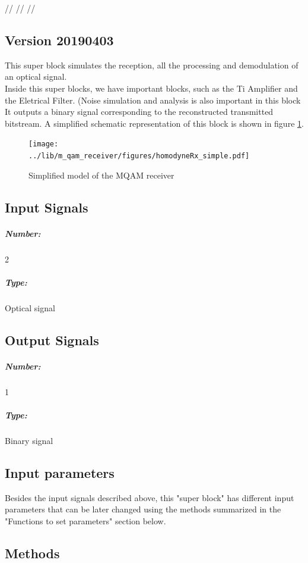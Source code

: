 //%
//%
//%

 \subsection*{\textbf{Version 20190403}}

This super block simulates the reception, all the processing and demodulation of an optical
signal.\\
Inside this super blocks, we have important blocks, such as the Ti Amplifier and the Eletrical Filter.
(Noise simulation and analysis is also important in this block
It outputs a binary signal corresponding to the reconstructed transmitted bitstream.
A simplified schematic representation of this block is shown in
figure \ref{fig:homodyneRx_simple}.

\begin{figure}[H]
	\centering
	\texttt{[image: ../lib/m\_qam\_receiver/figures/homodyneRx\_simple.pdf]}
	\caption{Simplified model of the MQAM receiver}\label{fig:homodyneRx_simple}
\end{figure}
\subsection*{Input Signals}

\subparagraph*{Number:} 2

\subparagraph*{Type:} Optical signal

\subsection*{Output Signals}

\subparagraph*{Number:} 1

\subparagraph*{Type:} Binary signal

\subsection*{Input parameters}

Besides the input signals described above, this "super block" has different input parameters
that can be later changed using the methods summarized in the "Functions to set parameters" section below.

\subsection*{Methods}


